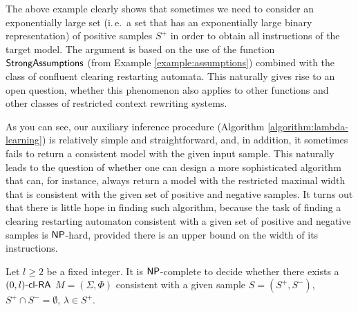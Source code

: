 The above example clearly shows that sometimes we need to consider an exponentially large set (i.\,e.\ a set that has an exponentially large binary representation) of positive samples $S^+$ in order to obtain all instructions of the target model. The argument is based on the use of the function $\textup{\sf StrongAssumptions}$ (from Example \ref{example:assumptions}) combined with the class of confluent clearing restarting automata. This naturally gives rise to an open question, whether this phenomenon also applies to other functions and other classes of restricted context rewriting systems.

As you can see, our auxiliary inference procedure (Algorithm \ref{algorithm:lambda-learning}) is relatively simple and straightforward, and, in addition, it sometimes fails to return a consistent model with the given input sample. This naturally leads to the question of whether one can design a more sophisticated algorithm that can, for instance, always return a model with the restricted maximal width that is consistent with the given set of positive and negative samples. It turns out that there is little hope in finding such algorithm, because the task of finding a clearing restarting automaton consistent with a given set of positive and negative samples is $\textup{\sf NP}$-hard, provided there is an upper bound on the width of its instructions.

\begin{theorem}[\citep{C12}]\label{theorem:0clrainference}
Let $l \ge 2$ be a fixed integer. It is $\textup{\sf NP}$-complete to decide whether there exists a $\textup{\sf $(0,l)$-\textup{\sf cl-RA\/}}$ $M = (\Sigma, \Phi)$ consistent with a given sample $S = (S^+, S^-)$, $S^+ \cap S^- = \emptyset$, $\lambda \in S^+$.
\end{theorem}

